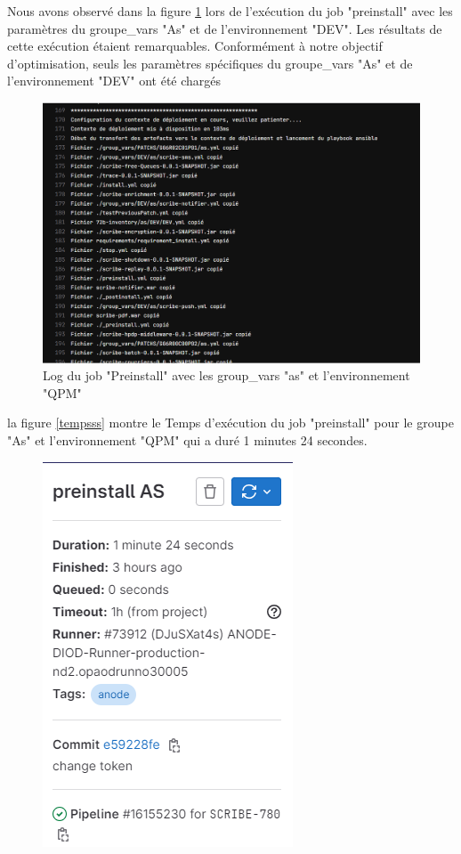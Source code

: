 {Nous avons observé dans la figure \ref{figlogop} lors de l'exécution du job "preinstall" avec les paramètres du groupe\_vars "As" et de l'environnement "DEV". Les résultats de cette exécution étaient remarquables. Conformément à notre objectif d'optimisation, seuls les paramètres spécifiques du groupe\_vars "As" et de l'environnement "DEV" ont été chargés

\begin{figure}[htbp]
     \centering
  \includegraphics[scale=0.5]{img/faraaah1.png}
        \caption{Log du job "Preinstall" avec les group\_vars "as" et l'environnement "QPM"} 
  \label{figlogop}
 \end{figure}
 la figure \ref{tempsss} montre le Temps d'exécution du job "preinstall" pour le groupe "As" et l'environnement "QPM" qui a duré 1 minutes 24 secondes.\\
 \begin{figure}[htbp]
     \centering
  \includegraphics[scale=0.56]{img/Capture.PNGop scribe 780.png}

\end{figure}}
